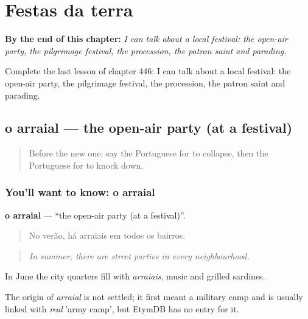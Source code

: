 
\chapter{Festas da terra}
\label{ch:pt-festas-da-terra}

\begin{chapteropening}
\textbf{By the end of this chapter:} \emph{I can talk about a local festival: the open-air party, the pilgrimage festival, the procession, the patron saint and parading.}

Complete the last lesson of chapter 446: I can talk about a local festival: the open-air party, the pilgrimage festival, the procession, the patron saint and parading.
\end{chapteropening}

\section[o arraial]{o arraial — the open-air party (at a festival)}

\label{lesson:PT-C446-arraial}



\begin{quote}
Before the new one: say the Portuguese for to collapse, then the Portuguese for to knock down.
\end{quote}

\subsection*{You'll want to know: o arraial}
\textbf{o arraial} — \textquotedblleft{}the open-air party (at a festival)\textquotedblright{}.

\begin{quote}
No verão, há arraiais em todos os bairros.
\end{quote}

\begin{quote}
\emph{In summer, there are street parties in every neighbourhood.}
\end{quote}

In June the city quarters fill with \emph{arraiais}, music and grilled sardines.

\begin{cousinweb}
The origin of \emph{arraial} is not settled; it first meant a military camp and is usually linked with \emph{real} 'army camp', but EtymDB has no entry for it.
\end{cousinweb}

